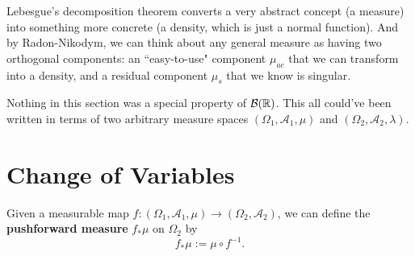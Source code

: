 \documentclass[twoside,10pt]{article}
\begin{document}
Lebesgue's decomposition theorem converts a very abstract concept (a measure) into something more concrete (a density, which is just a normal function). And by Radon-Nikodym, we can think about any general measure as having two orthogonal components: an ``easy-to-use" component $\mu_{ac}$ that we can transform into a density, and a residual component $\mu_{s}$ that we know is singular.

\begin{note}[]
Nothing in this section was a special property of $\mathcal{B}(\mathbb{R})$. This all could've been written in terms of two arbitrary measure spaces $(\Omega_1, \mathcal{A}_1, \mu)$ and $(\Omega_2, \mathcal{A}_{2}, \lambda)$.
\end{note}

\section{Change of Variables}

Given a measurable map $f: (\Omega_1, \mathcal{A}_{1},\mu) \to (\Omega_2, \mathcal{A}_{2})$, we can define the \textbf{pushforward measure} $f_{*}\mu$ on $\Omega_2$ by
\[
f_{*}\mu := \mu \circ f^{-1}.
\]
\end{document}
